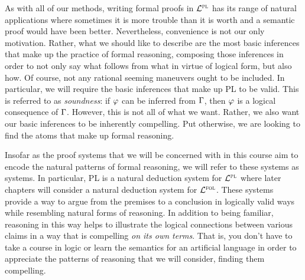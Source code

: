 As with all of our methods, writing formal proofs in $\mathcal{L}^{\textsc{pl}}$ has its range of natural applications where sometimes it is more trouble than it is worth and a semantic proof would have been better.
Nevertheless, convenience is not our only motivation.
Rather, what we should like to describe are the most basic inferences that make up the practice of formal reasoning, composing those inferences in order to not only say what follows from what in virtue of logical form, but also how. %
Of course, not any rational seeming maneuvers ought to be included.
In particular, we will require the basic inferences that make up PL to be valid.
This is referred to as \textit{soundness}: if $\varphi$ can be inferred from $\Gamma$, then $\varphi$ is a logical consequence of $\Gamma$. 
However, this is not all of what we want.
Rather, we also want our basic inferences to be inherently compelling.
Put otherwise, we are looking to find the atoms that make up formal reasoning.

Insofar as the proof systems that we will be concerned with in this course aim to encode the natural patterns of formal reasoning, we will refer to these systems as  systems.
In particular, PL is a natural deduction system for $\mathcal{L}^{\textsc{pl}}$ where later chapters will consider a natural deduction system for $\mathcal{L}^{\textsc{fol}}$.
These systems provide a way to argue from the premises to a conclusion in logically valid ways while resembling natural forms of reasoning.
In addition to being familiar, reasoning in this way helps to illustrate the logical connections between various claims in a way that is compelling \textit{on its own terms}.
That is, you don't have to take a course in logic or learn the semantics for an artificial language in order to appreciate the patterns of reasoning that we will consider, finding them compelling.


